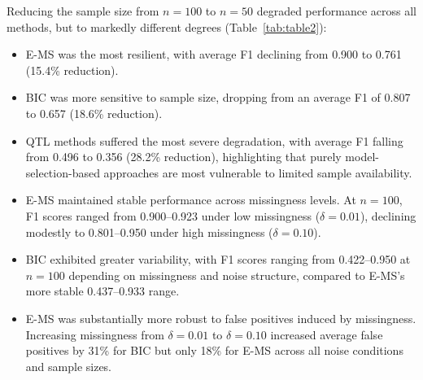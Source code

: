 \documentclass[
  12pt,
]{article}
\begin{document}
Reducing the sample size from $n = 100$ to $n = 50$ degraded performance 
across all methods, but to markedly different degrees 
(Table~\ref{tab:table2}):

\begin{itemize}
    \item E-MS was the most resilient, with average F1 declining 
    from 0.900 to 0.761 (15.4\% reduction).

    \item BIC was more sensitive to sample size, dropping from an 
    average F1 of 0.807 to 0.657 (18.6\% reduction).

    \item QTL methods suffered the most severe degradation, with 
    average F1 falling from 0.496 to 0.356 (28.2\% reduction), highlighting 
    that purely model-selection-based approaches are most vulnerable to 
    limited sample availability.
\end{itemize}



\begin{itemize}
    \item E-MS maintained stable performance across missingness 
    levels. At $n = 100$, F1 scores ranged from 0.900--0.923 under low 
    missingness ($\delta = 0.01$), declining modestly to 0.801--0.950 under 
    high missingness ($\delta = 0.10$).

    \item BIC exhibited greater variability, with F1 scores ranging 
    from 0.422--0.950 at $n = 100$ depending on missingness and noise 
    structure, compared to E-MS's more stable 0.437--0.933 range.

    \item E-MS was substantially more robust to false positives 
    induced by missingness. Increasing missingness from $\delta = 0.01$ to 
    $\delta = 0.10$ increased average false positives by 31\% for BIC but 
    only 18\% for E-MS across all noise conditions and sample sizes.
\end{itemize}

\end{document}
